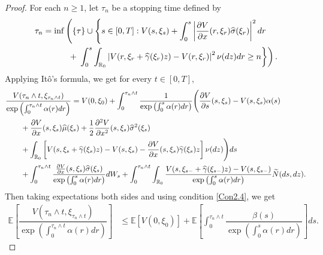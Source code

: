 \documentclass[11pt]{article}
\theoremstyle{theorem}
\theoremstyle{definition}
\newcommand{\bR}{\mathbb{R}}
\newcommand{\1}{{\bf 1}}
\begin{document}
\begin{proof}
For each $n\geq 1$, let $\tau_n$ be a stopping time defined by 
\begin{align*}
   &\tau_n=\inf \left( \{\tau \}  \cup \left\{  s\in [0, T]: V(s, \xi_s)+ \int_0^s  \left|\dfrac{\partial V}{\partial x}(r, \xi_r) \widehat{\sigma}  (\xi_r)\right|^2 dr \right. \right. \notag \\
    &  \quad \quad \quad \quad  +\left. \left. \int_0^s \int_{\bR_0} \left| V(r, \xi_{r} + \widehat{\gamma} (\xi_{r })z ) - V(r, \xi_{r}) \right|^2 \nu (dz) dr  \geq n \right\} \right).
    \end{align*}
Applying It\^o's formula, we get for every $t\in [0, T],$
\begin{align*}
 &\dfrac{ V(\tau_n \wedge t, \xi_{\tau_n \wedge t}) }{\exp \left( \int_0^{\tau_n \wedge t} \alpha(r) dr \right)} = V(0, \xi_0)  + \int_0^{\tau_n \wedge t} \dfrac{1}{\exp \left( \int_0^{s} \alpha(r) dr \right)}\Bigg( \frac{\partial V}{\partial s}(s, \xi_s)- V(s, \xi_s) \alpha(s)  \notag \\
& \qquad +  \frac{\partial V}{\partial x}(s, \xi_s)\widehat{\mu}(\xi_s)+\frac{1}{2}\frac{\partial^2 V}{\partial x^2}(s, \xi_s)\widehat{\sigma}^2(\xi_s)  \notag \\ 
 & \qquad +  \int_{\bR_0} \left[ V(s, \xi_s + \widehat{\gamma} (\xi_{s})z ) - V(s, \xi_s) - \dfrac{\partial V}{\partial x}(s, \xi_s) \widehat{\gamma} (\xi_{s})z  \right] \nu (dz) \Bigg) ds \notag \\
& \qquad + \int_0^{\tau_n \wedge t}  \dfrac{\frac{\partial V}{\partial x}(s, \xi_s)\widehat{\sigma}(\xi_s)}{\exp \left( \int_0^{s} \alpha(r) dr \right)} dW_s + \int_0^{\tau_n \wedge t} \int_{\bR_0}  \dfrac{V(s, \xi_{s-} + \widehat{\gamma} (\xi_{s- })z ) - V(s, \xi_{s-}) }{\exp \left( \int_0^{s} \alpha(r) dr \right)}   \widetilde{N}(ds,dz). 
\end{align*}
Then taking expectations both sides and using condition \eqref{Con2.4}, we get
\begin{align*}
\mathbb{E}\left[\dfrac{ V(\tau_n \land t, \xi_{\tau_n \land t})}{\exp \left( \int_0^{\tau_n \land t} \alpha(r) dr \right)} \right] 
& \leq  \mathbb{E}[V(0, \xi_0)]  + \mathbb{E} \left[ \int_0^{\tau_n \land t}  \dfrac{\beta(s)}{\exp \left( \int_0^{s} \alpha(r) dr \right)} \right]ds.
\end{align*}

\end{proof}
\end{document}
